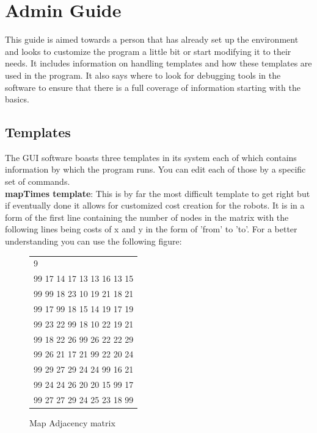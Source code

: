 	\section{Admin Guide}
	This guide is aimed towards a person that has already set up the environment and looks to customize the program a little bit or start modifying it to their needs. It includes information on handling templates and how these templates are used in the program. It also says where to look for debugging tools in the software to ensure that there is a full coverage of information starting with the basics.
		\subsection{Templates}
		The GUI software boasts three templates in its system each of which contains information by which the program runs. You can edit each of those by a specific set of commands.\\
		\textbf{mapTimes template}: This is by far the most difficult template to get right but if eventually done it allows for customized cost creation for the robots. It is in a form of the first line containing the number of nodes in the matrix with the following lines being costs of x and y in the form of 'from' to 'to'. For a better understanding you can use the following figure:
		\begin{figure}[!htp]
		\centering
		\begin{tabular} {l}

			9 \\
			99 17 14 17 13 13 16 13 15 \\
			99 99 18 23 10 19 21 18 21 \\
			99 17 99 18 15 14 19 17 19 \\
			99 23 22 99 18 10 22 19 21 \\
			99 18 22 26 99 26 22 22 29 \\
			99 26 21 17 21 99 22 20 24 \\
			99 29 27 29 24 24 99 16 21 \\
			99 24 24 26 20 20 15 99 17 \\
			99 27 27 29 24 25 23 18 99 \\
		\end{tabular}
		\caption{Map Adjacency matrix}
		\end{figure}

